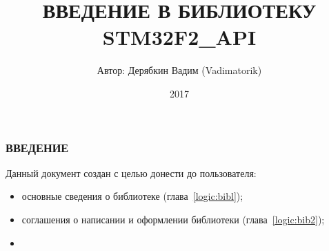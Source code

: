 \documentclass[a4paper, 12pt]{report}		%
\begin{document}
	\title {ВВЕДЕНИЕ В БИБЛИОТЕКУ STM32F2\_API}			%
	\author {Автор: Дерябкин Вадим (Vadimatorik)}
	\date {2017}
	\maketitle

\subsubsection{ВВЕДЕНИЕ}
Данный документ создан с целью донести до пользователя:
\begin{itemize}
	\item основные сведения о библиотеке (глава~\ref{logic:bibl});
	\item соглашения о написании и оформлении библиотеки (глава~\ref{logic:bib2});
	\item
\end{itemize}


	\tableofcontents
	\clearpage							%
	
\end{document}
